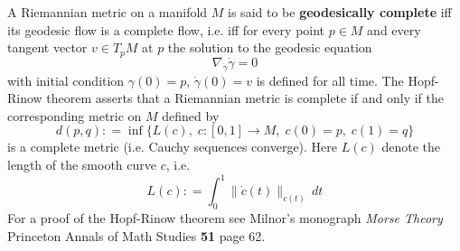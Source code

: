 \documentclass[12pt]{article}
\begin{document}
A Riemannian metric on a manifold $M$ is said to be {\bf geodesically complete} iff its geodesic flow is a complete flow,
i.e. iff for every point $p\in M$ and every tangent vector $v\in T_pM$ at $p$ the solution to the geodesic equation
$$
\nabla_{\dot{\gamma}}\dot{\gamma}=0
$$
with initial condition $\gamma(0)=p$, $\dot{\gamma}(0)=v$ is defined for all time. 
The Hopf-Rinow theorem
asserts that a Riemannian metric is complete if and only if the corresponding metric on $M$ defined by
$$
   d(p,q)\colon=\inf\{L(c), \; c\colon[0,1]\to M,\; c(0)=p,\; c(1)=q\}
$$
is a complete metric (i.e. Cauchy sequences converge). Here $L(c)$ denote the length of the smooth curve $c$, i.e.
$$
   L(c)\colon=\int_0^1 \|\dot{c}(t)\|_{c(t)} \,dt
$$
For a proof of the Hopf-Rinow theorem see Milnor's monograph {\em Morse Theory} 
Princeton Annals of Math Studies {\bf 51} page 62.


\end{document}
